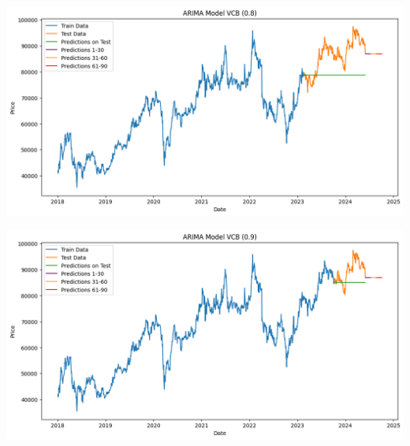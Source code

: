 \documentclass[conference]{IEEEtran}
\begin{document}
\begin{minipage}{0.23\textwidth}
    \centering
    \includegraphics[width=\linewidth]{images/ARIMA/ARIMA_VCB_82.png}
    \label{fig:image1}
\end{minipage}
\hfill
\begin{minipage}{0.23\textwidth}
    \centering
    \includegraphics[width=\linewidth]{images/ARIMA/ARIMA_VCB_91.png}
    \label{fig:image2}
\end{minipage}
\end{document}
